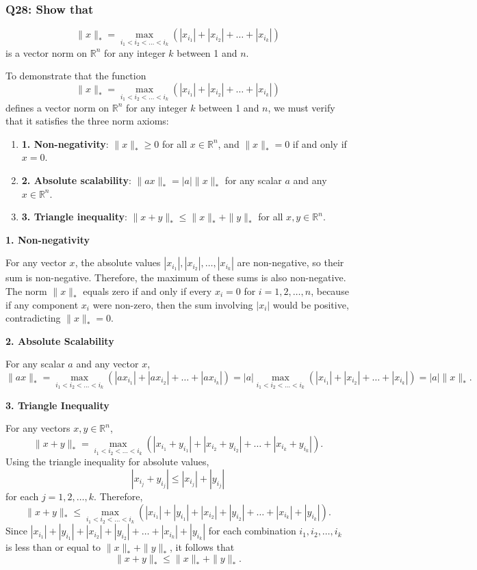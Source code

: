 \documentclass[8pt]{article}
\begin{document}
\subsubsection*{Q28: Show that}
\[
\| x \|_* = \max_{i_1 < i_2 < \ldots < i_k} ( |x_{i_1}| + |x_{i_2}| + \ldots + |x_{i_k}| )
\]
is a vector norm on \( \mathbb{R}^n \) for any integer \( k \) between 1 and \( n \).

To demonstrate that the function
\[
\| x \|_* = \max_{i_1 < i_2 < \ldots < i_k} ( |x_{i_1}| + |x_{i_2}| + \ldots + |x_{i_k}| )
\]
defines a vector norm on \(\mathbb{R}^n\) for any integer \(k\) between 1 and \(n\), we must verify that it satisfies the three norm axioms:

\begin{enumerate}
    \item \textbf{1. Non-negativity}: \(\|x\|_* \geq 0\) for all \(x \in \mathbb{R}^n\), and \(\|x\|_* = 0\) if and only if \(x = 0\).
    \item \textbf{2. Absolute scalability}: \(\|ax\|_* = |a|\|x\|_*\) for any scalar \(a\) and any \(x \in \mathbb{R}^n\).
    \item \textbf{3. Triangle inequality}: \(\|x + y\|_* \leq \|x\|_* + \|y\|_*\) for all \(x, y \in \mathbb{R}^n\).
\end{enumerate}

\textbf{1. Non-negativity}

For any vector \(x\), the absolute values \(|x_{i_1}|, |x_{i_2}|, \ldots, |x_{i_k}|\) are non-negative, so their sum is non-negative. Therefore, the maximum of these sums is also non-negative. The norm \(\|x\|_*\) equals zero if and only if every \(x_i = 0\) for \(i = 1, 2, \ldots, n\), because if any component \(x_i\) were non-zero, then the sum involving \(|x_i|\) would be positive, contradicting \(\|x\|_* = 0\).

\textbf{2. Absolute Scalability}

For any scalar \(a\) and any vector \(x\),
\[
\|ax\|_* = \max_{i_1 < i_2 < \ldots < i_k} ( |a x_{i_1}| + |a x_{i_2}| + \ldots + |a x_{i_k}| )
= |a| \max_{i_1 < i_2 < \ldots < i_k} ( |x_{i_1}| + |x_{i_2}| + \ldots + |x_{i_k}| )
= |a|\|x\|_*.
\]

\textbf{3. Triangle Inequality}

For any vectors \(x, y \in \mathbb{R}^n\),
\[
\|x + y\|_* = \max_{i_1 < i_2 < \ldots < i_k} ( |x_{i_1} + y_{i_1}| + |x_{i_2} + y_{i_2}| + \ldots + |x_{i_k} + y_{i_k}| ).
\]
Using the triangle inequality for absolute values,
\[
|x_{i_j} + y_{i_j}| \leq |x_{i_j}| + |y_{i_j}|
\]
for each \(j = 1, 2, \ldots, k\). Therefore,
\[
\|x + y\|_* \leq \max_{i_1 < i_2 < \ldots < i_k} (|x_{i_1}| + |y_{i_1}| + |x_{i_2}| + |y_{i_2}| + \ldots + |x_{i_k}| + |y_{i_k}|).
\]
Since \(|x_{i_1}| + |y_{i_1}| + |x_{i_2}| + |y_{i_2}| + \ldots + |x_{i_k}| + |y_{i_k}|\) for each combination \(i_1, i_2, \ldots, i_k\) is less than or equal to \(\|x\|_* + \|y\|_*\), it follows that
\[
\|x + y\|_* \leq \|x\|_* + \|y\|_*.
\]
\end{document}

